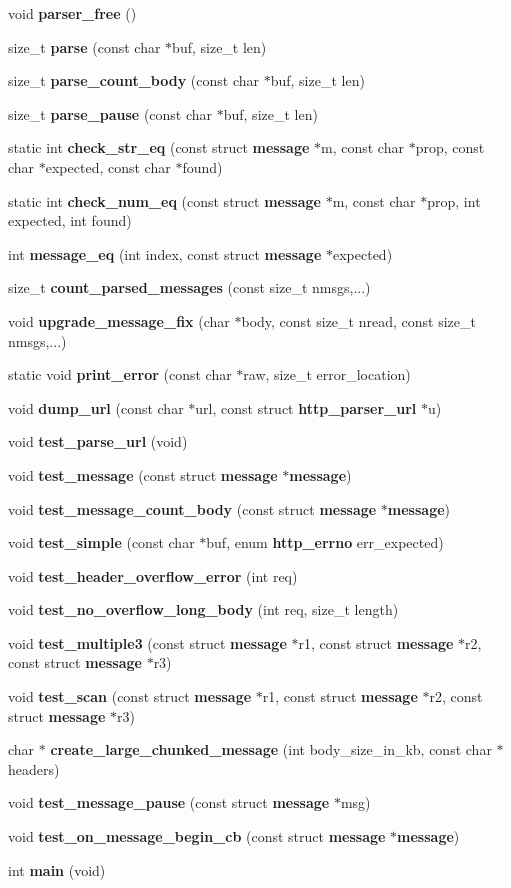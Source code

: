 \begin{DoxyCompactItemize}
void {\bf parser\+\_\+free} ()
\item 
size\+\_\+t {\bf parse} (const char $\ast$buf, size\+\_\+t len)
\item 
size\+\_\+t {\bf parse\+\_\+count\+\_\+body} (const char $\ast$buf, size\+\_\+t len)
\item 
size\+\_\+t {\bf parse\+\_\+pause} (const char $\ast$buf, size\+\_\+t len)
\item 
static int {\bf check\+\_\+str\+\_\+eq} (const struct {\bf message} $\ast$m, const char $\ast$prop, const char $\ast$expected, const char $\ast$found)
\item 
static int {\bf check\+\_\+num\+\_\+eq} (const struct {\bf message} $\ast$m, const char $\ast$prop, int expected, int found)
\item 
int {\bf message\+\_\+eq} (int index, const struct {\bf message} $\ast$expected)
\item 
size\+\_\+t {\bf count\+\_\+parsed\+\_\+messages} (const size\+\_\+t nmsgs,...)
\item 
void {\bf upgrade\+\_\+message\+\_\+fix} (char $\ast$body, const size\+\_\+t nread, const size\+\_\+t nmsgs,...)
\item 
static void {\bf print\+\_\+error} (const char $\ast$raw, size\+\_\+t error\+\_\+location)
\item 
void {\bf dump\+\_\+url} (const char $\ast$url, const struct {\bf http\+\_\+parser\+\_\+url} $\ast$u)
\item 
void {\bf test\+\_\+parse\+\_\+url} (void)
\item 
void {\bf test\+\_\+message} (const struct {\bf message} $\ast${\bf message})
\item 
void {\bf test\+\_\+message\+\_\+count\+\_\+body} (const struct {\bf message} $\ast${\bf message})
\item 
void {\bf test\+\_\+simple} (const char $\ast$buf, enum {\bf http\+\_\+errno} err\+\_\+expected)
\item 
void {\bf test\+\_\+header\+\_\+overflow\+\_\+error} (int req)
\item 
void {\bf test\+\_\+no\+\_\+overflow\+\_\+long\+\_\+body} (int req, size\+\_\+t length)
\item 
void {\bf test\+\_\+multiple3} (const struct {\bf message} $\ast$r1, const struct {\bf message} $\ast$r2, const struct {\bf message} $\ast$r3)
\item 
void {\bf test\+\_\+scan} (const struct {\bf message} $\ast$r1, const struct {\bf message} $\ast$r2, const struct {\bf message} $\ast$r3)
\item 
char $\ast$ {\bf create\+\_\+large\+\_\+chunked\+\_\+message} (int body\+\_\+size\+\_\+in\+\_\+kb, const char $\ast$headers)
\item 
void {\bf test\+\_\+message\+\_\+pause} (const struct {\bf message} $\ast$msg)
\item 
void {\bf test\+\_\+on\+\_\+message\+\_\+begin\+\_\+cb} (const struct {\bf message} $\ast${\bf message})
\item 
int {\bf main} (void)
\end{DoxyCompactItemize}

